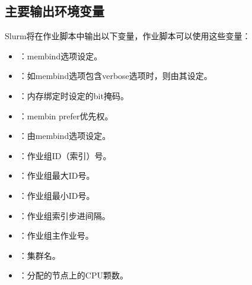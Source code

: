 \documentclass[a4paper,12pt,english]{sphinxmanual}
\begin{document}
\subsection{主要输出环境变量}
\label{\detokenize{slurm/slurm:id27}}\label{\detokenize{slurm/slurm:id28}}
\sphinxAtStartPar
Slurm将在作业脚本中输出以下变量，作业脚本可以使用这些变量：
\begin{itemize}
\item {} 
\sphinxAtStartPar
{}：\sphinxhyphen{}\sphinxhyphen{}mem\sphinxhyphen{}bind选项设定。

\item {} 
\sphinxAtStartPar
{}：如\sphinxhyphen{}\sphinxhyphen{}mem\sphinxhyphen{}bind选项包含verbose选项时，则由其设定。

\item {} 
\sphinxAtStartPar
{}：内存绑定时设定的bit掩码。

\item {} 
\sphinxAtStartPar
{}：\sphinxhyphen{}\sphinxhyphen{}mem\sphinxhyphen{}bin prefer优先权。

\item {} 
\sphinxAtStartPar
{}：由\sphinxhyphen{}\sphinxhyphen{}mem\sphinxhyphen{}bind选项设定。

\item {} 
\sphinxAtStartPar
{}：作业组ID（索引）号。

\item {} 
\sphinxAtStartPar
{}：作业组最大ID号。

\item {} 
\sphinxAtStartPar
{}：作业组最小ID号。

\item {} 
\sphinxAtStartPar
{}：作业组索引步进间隔。

\item {} 
\sphinxAtStartPar
{}：作业组主作业号。

\item {} 
\sphinxAtStartPar
{}：集群名。

\item {} 
\sphinxAtStartPar
{}：分配的节点上的CPU颗数。


\end{itemize}
\end{document}
